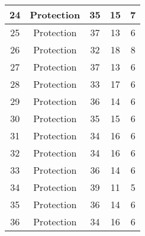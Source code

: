 \documentclass[results.tex]{subfiles}
\begin{document}
\begin{center}
\begin{tabular}{| c || c | c | c | c |}
            \hline
            24                      & Protection                   & 35                     & 15                      & 7                    \\
            \hline
            25                      & Protection                   & 37                     & 13                      & 6                    \\
            \hline
            26                      & Protection                   & 32                     & 18                      & 8                    \\
            \hline
            27                      & Protection                   & 37                     & 13                      & 6                    \\
            \hline
            28                      & Protection                   & 33                     & 17                      & 6                    \\
            \hline
            29                      & Protection                   & 36                     & 14                      & 6                    \\
            \hline
            30                      & Protection                   & 35                     & 15                      & 6                    \\
            \hline
            31                      & Protection                   & 34                     & 16                      & 6                    \\
            \hline
            32                      & Protection                   & 34                     & 16                      & 6                    \\
            \hline
            33                      & Protection                   & 36                     & 14                      & 6                    \\
            \hline
            34                      & Protection                   & 39                     & 11                      & 5                    \\
            \hline
            35                      & Protection                   & 36                     & 14                      & 6                    \\
            \hline
            36                      & Protection                   & 34                     & 16                      & 6                    \\

\end{tabular}
\end{center}
\end{document}
